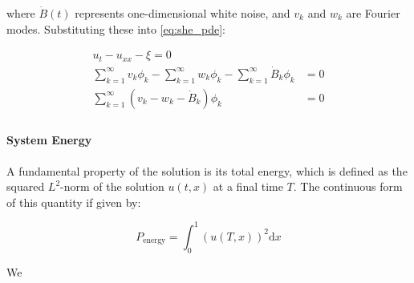 where $\dot{B}(t)$ represents one-dimensional white noise, and $v_k$ and $w_k$ are 
Fourier modes. Substituting these into \eqref{eq:she_pde}:

\begin{align}
    u_t - u_{xx} - \xi = 0 \\
    \sum_{k=1}^\infty v_k\phi_k - \sum_{k=1}^\infty w_k\phi_k - \sum_{k=1}^\infty
    \dot{B}_k \phi_k &= 0 \\
    \sum_{k=1}^\infty \left(v_k - w_k - \dot{B}_k\right)\phi_k &= 0\\
\end{align}


\paragraph{System Energy}

A fundamental property of the solution is its total energy, which is defined 
as the squared $L^2$-norm of the solution $u(t,x)$ at a final time $T$. The 
continuous form of this quantity if given by:

\begin{equation}\label{eq:system_energy}
    P_{\text{energy}} = \int_0^1 (u(T,x))^2 \mathrm{d}x
\end{equation}

We 



